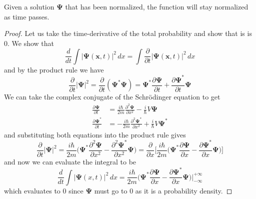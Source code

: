 \documentclass{article}
\begin{document}
    \begin{theorem}
      \label{thm:normalization-is-preserved-in-time}
 
      Given a solution $\boldsymbol{\Psi}$ that has been normalized, the function will stay normalized as time passes. 
    \end{theorem}
    \begin{proof} 
      Let us take the time-derivative of the total probability and show that is is $0$. We show that 
      \begin{equation} 
        \frac{d}{dt}  \int |\boldsymbol{\Psi} (\mathbf{x}, t)|^2 \,dx = \int \frac{\partial}{\partial t} |\boldsymbol{\Psi}(\mathbf{x}, t)|^2 \,dx
      \end{equation}
      and by the product rule we have 
      \begin{equation} 
        \frac{\partial}{\partial t} |\boldsymbol{\Psi}|^2 = \frac{\partial}{\partial t} (\boldsymbol{\Psi}^\ast \boldsymbol{\Psi}) = \boldsymbol{\Psi}^\ast \frac{\partial \boldsymbol{\Psi}}{\partial t} + \frac{\partial \boldsymbol{\Psi}^\ast}{\partial t} \boldsymbol{\Psi}
      \end{equation}
      We can take the complex conjugate of the Schr\"odinger equation to get 
      \begin{align} 
        \frac{\partial \boldsymbol{\Psi}}{\partial t} & = \frac{i \hbar}{2m} \frac{\partial^2 \boldsymbol{\Psi}}{\partial x^2} - \frac{i}{\hbar} V \boldsymbol{\Psi} \\
        \frac{\partial \boldsymbol{\Psi}^\ast}{\partial t} & = - \frac{i \hbar}{2m} \frac{\partial^2 \boldsymbol{\Psi}^\ast}{\partial x^2} + \frac{i}{\hbar} V \boldsymbol{\Psi}^\ast 
      \end{align}
      and substituting both equations into the product rule gives 
      \begin{equation} 
        \frac{\partial}{\partial t} |\boldsymbol{\Psi}|^2 = \frac{i \hbar}{2m} \bigg( \boldsymbol{\Psi}^\ast \frac{\partial^2 \boldsymbol{\Psi}}{\partial x^2} - \frac{\partial^2 \boldsymbol{\Psi}^\ast}{\partial x^2} \boldsymbol{\Psi} \bigg) = \frac{\partial}{\partial x} \bigg[ \frac{i \hbar}{2m} \bigg( \boldsymbol{\Psi}^\ast \frac{\partial \boldsymbol{\Psi}}{\partial x} - \frac{\partial \boldsymbol{\Psi}^\ast}{\partial x} \boldsymbol{\Psi} \bigg)\bigg]
      \end{equation}
      and now we can evaluate the integral to be 
      \begin{equation} 
        \frac{d}{dt} \int |\boldsymbol{\Psi}(x, t)|^2 \,dx = \frac{i \hbar}{2m} \big( \boldsymbol{\Psi}^\ast \frac{\partial \boldsymbol{\Psi}}{\partial x} - \frac{\partial \boldsymbol{\Psi}^\ast}{\partial x} \boldsymbol{\Psi} \bigg) \bigg|_{-\infty}^{+\infty} 
      \end{equation}
      which evaluates to $0$ since $\boldsymbol{\Psi}$ must go to $0$ as it is a probability density. 
    \end{proof}
\end{document}
